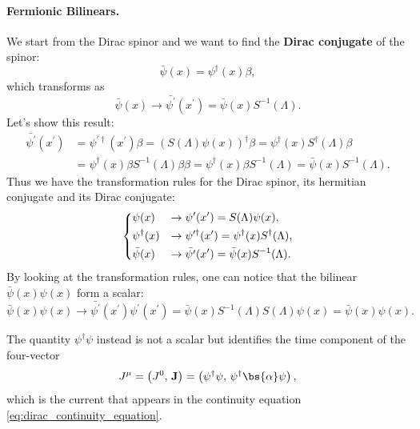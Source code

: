 \paragraph{Fermionic Bilinears.}
We start from the Dirac spinor and we want to find the \textbf{Dirac conjugate} of the spinor:
\begin{equation}
    \bar{\psi} (x) = \psi^{\dagger}(x) \beta,
    \label{eq:dirac_conjugate_spinor}
\end{equation}
which transforms as
\[
    \bar{\psi}(x) \to \bar{\psi^{\prime}}(x^{\prime}) = \bar{\psi}(x)S^{-1}(\Lambda).
\]
Let's show this result:
\[
    \begin{aligned}
        \bar{\psi^{\prime}}(x^{\prime}) & = \psi^{\prime \dagger}(x^{\prime}) \beta = \left(S(\Lambda) \psi(x)\right)^{\dagger} \beta = \psi^{\dagger}(x) S^{\dagger}(\Lambda) \beta \\
                                        & = \psi^{\dagger}(x) \beta S^{-1}(\Lambda) \beta \beta = \psi^{\dagger}(x) \beta S^{-1}(\Lambda) = \bar{\psi}(x) S^{-1}(\Lambda).
    \end{aligned}
\]
Thus we have the transformation rules for the Dirac spinor, its hermitian conjugate and its Dirac conjugate:
\begin{equation}
    \begin{dcases}
        \psi(x)           & \to \psi^{\prime}(x^{\prime}) = S(\Lambda) \psi(x),                             \\
        \psi^{\dagger}(x) & \to \psi^{\prime \dagger}(x^{\prime}) = \psi^{\dagger}(x) S^{\dagger}(\Lambda), \\
        \bar{\psi}(x)     & \to \bar{\psi^{\prime}}(x^{\prime}) = \bar{\psi}(x) S^{-1}(\Lambda).
    \end{dcases}
    \label{eq:dirac_spinor_transformation_rules}
\end{equation}
By looking at the transformation rules, one can notice that the bilinear \( \bar{\psi}(x) \psi(x)\) form a scalar:
\[
    \bar{\psi}(x) \psi(x) \to \bar{\psi^{\prime} }(x^{\prime} ) \psi^{\prime} (x^{\prime} ) = \bar{\psi}(x) S^{-1}(\Lambda) S(\Lambda) \psi(x) = \bar{\psi}(x) \psi(x).
\]

\begin{remark}
    The quantity \(\psi^{\dagger}\psi\) instead is not a scalar but identifies the time component of the four-vector
    \[
        J^{\mu} = \left(J^0,\,\mathbf{J}\right) = \left( \psi^{\dagger} \psi,\, \psi^{\dagger} \bs{\alpha} \psi \right),
    \]
    which is the current that appears in the continuity equation \eqref{eq:dirac_continuity_equation}.
\end{remark}

